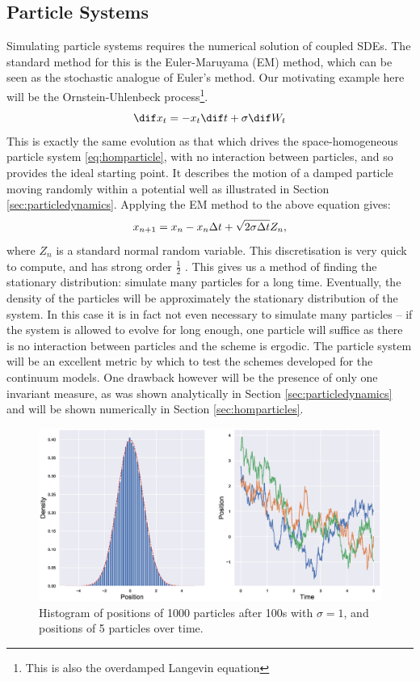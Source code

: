 \subsection{Particle Systems}\label{sec:particlemethods}
Simulating particle systems requires the numerical solution of coupled SDEs. The standard method for this is the Euler-Maruyama (EM) method, which can be seen as the stochastic analogue of Euler's method. Our motivating example here will be the Ornstein-Uhlenbeck process\footnote{This is also the overdamped Langevin equation}. 
\begin{equation}
\dif x_t = - x_t \dif t + \sigma \dif W_t
\end{equation}
This is exactly the same evolution as that which drives the space-homogeneous particle system \eqref{eq:homparticle}, with no interaction between particles, and so provides the ideal starting point. It describes the motion of a damped particle moving randomly within a potential well as illustrated in Section \ref{sec:particledynamics}. Applying the EM method to the above equation gives:
\[ x_{n+1} = x_n -  x_n\Delta t + \sqrt{2\sigma\Delta t}Z_n,  \]
where $Z_n$ is a standard normal random variable. This discretisation is very quick to compute, and has strong order $\frac{1}{2}$ \cite{Higham01}. This gives us a method of finding the stationary distribution: simulate many particles for a long time. Eventually, the density of the particles will be approximately the stationary distribution of the system. In this case it is in fact not even necessary to simulate many particles -- if the system is allowed to evolve for long enough, one particle will suffice as there is no interaction between particles and the scheme is ergodic. The particle system will be an excellent metric by which to test the schemes developed for the continuum models. One drawback however will be the presence of only one invariant measure, as was shown analytically in Section \ref{sec:particledynamics} and will be shown numerically in Section \ref{sec:homparticles}.
\begin{figure}
    \centering
    \includegraphics[width=\linewidth]{Figures/OUparticletraj}
    \caption{Histogram of positions of 1000 particles after 100s with $\sigma = 1$, and positions of 5 particles over time.}
    \label{fig:ouparticletraj}
\end{figure}

